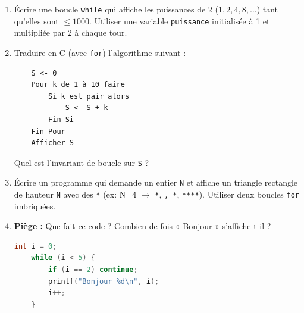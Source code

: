 \documentclass[11pt]{article}
\begin{document}
\begin{exercice}
\begin{enumerate}
    \item Écrire une boucle \texttt{while} qui affiche les puissances de 2 ($1, 2, 4, 8, \dots$) tant qu'elles sont $\le 1000$. Utiliser une variable \texttt{puissance} initialisée à 1 et multipliée par 2 à chaque tour.
    \item Traduire en C (avec \texttt{for}) l'algorithme suivant :
    \begin{lstlisting}
    S <- 0
    Pour k de 1 à 10 faire
        Si k est pair alors
            S <- S + k
        Fin Si
    Fin Pour
    Afficher S
    \end{lstlisting}
    Quel est l'invariant de boucle sur \texttt{S} ?
    \item Écrire un programme qui demande un entier \texttt{N} et affiche un triangle rectangle de hauteur \texttt{N} avec des \texttt{*} (ex: N=4 $\rightarrow$ \texttt{*}, \texttt{\textbf{}, \texttt{}*}, \texttt{****}). Utiliser deux boucles \texttt{for} imbriquées.
    \item \textbf{Piège :} Que fait ce code ? Combien de fois « Bonjour » s'affiche-t-il ?
    \begin{lstlisting}[language=C]
    int i = 0;
    while (i < 5) {
        if (i == 2) continue;
        printf("Bonjour %d\n", i);
        i++;
    }
    \end{lstlisting}
\end{enumerate}
\end{exercice}
\end{document}
